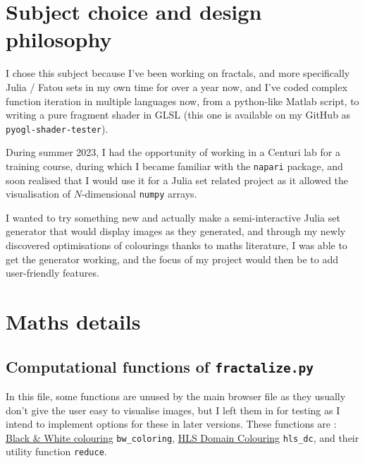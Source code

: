 \documentclass{article}
\begin{document}
\section{Subject choice and design philosophy}

I chose this subject because I've been working on fractals, and more specifically Julia / Fatou sets in my own time for over a year now, and I've coded complex function iteration in multiple languages now, from a python-like Matlab script, to writing a pure fragment shader in GLSL (this one is available on my GitHub as \texttt{pyogl-shader-tester}). \\
\vspace{5mm}

During summer 2023, I had the opportunity of working in a Centuri lab for a training course, during which I became familiar with the \texttt{napari} package, and soon realised that I would use it for a Julia set related project as it allowed the visualisation of $N$-dimensional \texttt{numpy} arrays. \\
\vspace{5mm}

I wanted to try something new and actually make a semi-interactive Julia set generator that would display images as they generated, and through my newly discovered optimisations of colourings thanks to maths literature, I was able to get the generator working, and the focus of my project would then be to add user-friendly features. \\
\vspace{5mm}

\section{Maths details}

\subsection{Computational functions of \texttt{fractalize.py}}

In this file, some functions are unused by the main browser file as they usually don't give the user easy to visualise images, but I left them in for testing as I intend to implement options for these in later versions. These functions are : \\
\underline{Black \& White colouring} \texttt{bw\_coloring}, \underline{HLS Domain Colouring} \texttt{hls\_dc}, and their utility function \texttt{reduce}. \\
\vspace{5mm}
\end{document}
